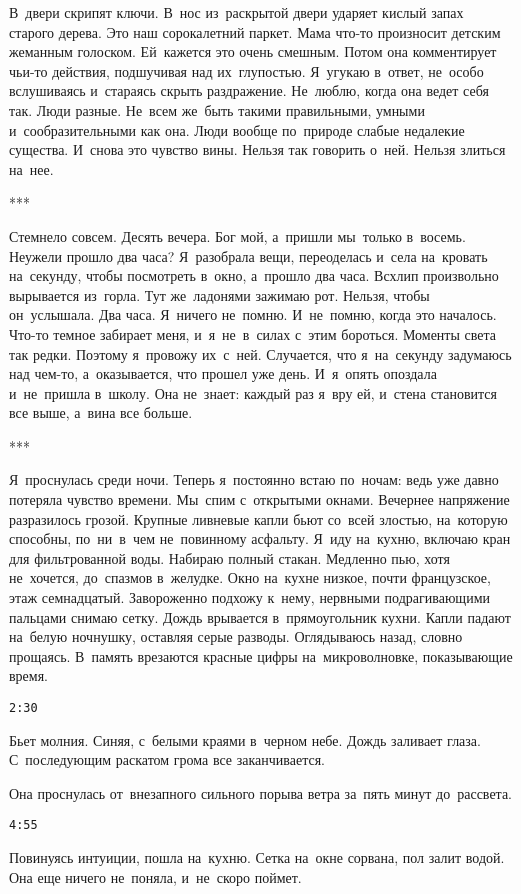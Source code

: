 В~двери скрипят ключи.
В~нос из~раскрытой двери ударяет кислый запах старого дерева.
Это наш сорокалетний паркет.
Мама что-то произносит детским жеманным голоском.
Ей~кажется это очень смешным.
Потом она комментирует чьи-то действия, подшучивая над их~глупостью.
Я~угукаю в~ответ, не~особо вслушиваясь и~стараясь скрыть раздражение.
Не~люблю, когда она ведет себя так.
Люди разные.
Не~всем же~быть такими правильными, умными и~сообразительными как она.
Люди вообще по~природе слабые недалекие существа.
И~снова это чувство вины.
Нельзя так говорить о~ней.
Нельзя злиться на~нее.

\begin{center}
	***
\end{center}

Стемнело совсем.
Десять вечера.
Бог мой, а~пришли мы~только в~восемь.
Неужели прошло два часа? Я~разобрала вещи, переоделась и~села на~кровать на~секунду, чтобы посмотреть в~окно, а~прошло два часа.
Всхлип произвольно вырывается из~горла.
Тут же~ладонями зажимаю рот.
Нельзя, чтобы он~услышала.
Два часа.
Я~ничего не~помню.
И~не~помню, когда это началось.
Что-то темное забирает меня, и~я~не~в~силах с~этим бороться.
Моменты света так редки.
Поэтому я~провожу их~с~ней.
Случается, что я~на~секунду задумаюсь над чем-то, а~оказывается, что прошел уже день.
И~я~опять опоздала и~не~пришла в~школу.
Она не~знает: каждый раз я~вру ей, и~стена становится все выше, а~вина все больше.

\begin{center}
	***
\end{center}

Я~проснулась среди ночи.
Теперь я~постоянно встаю по~ночам: ведь уже давно потеряла чувство времени.
Мы~спим с~открытыми окнами.
Вечернее напряжение разразилось грозой.
Крупные ливневые капли бьют со~всей злостью, на~которую способны, по~ни~в~чем не~повинному асфальту.
Я~иду на~кухню, включаю кран для фильтрованной воды.
Набираю полный стакан.
Медленно пью, хотя не~хочется, до~спазмов в~желудке.
Окно на~кухне низкое, почти французское, этаж семнадцатый.
Завороженно подхожу к~нему, нервными подрагивающими пальцами снимаю сетку.
Дождь врывается в~прямоугольник кухни.
Капли падают на~белую ночнушку, оставляя серые разводы.
Оглядываюсь назад, словно прощаясь.
В~память врезаются красные цифры на~микроволновке, показывающие время.
\begin{center}
\texttt{2:30}
\end{center}
Бьет молния.
Синяя, с~белыми краями в~черном небе.
Дождь заливает глаза.
С~последующим раскатом грома все заканчивается.


\vspace{5mm}


Она проснулась от~внезапного сильного порыва ветра за~пять минут до~рассвета.
\begin{center}
\texttt{4:55}
\end{center}
Повинуясь интуиции, пошла на~кухню.
Сетка на~окне сорвана, пол залит водой.
Она еще ничего не~поняла, и~не~скоро поймет.


